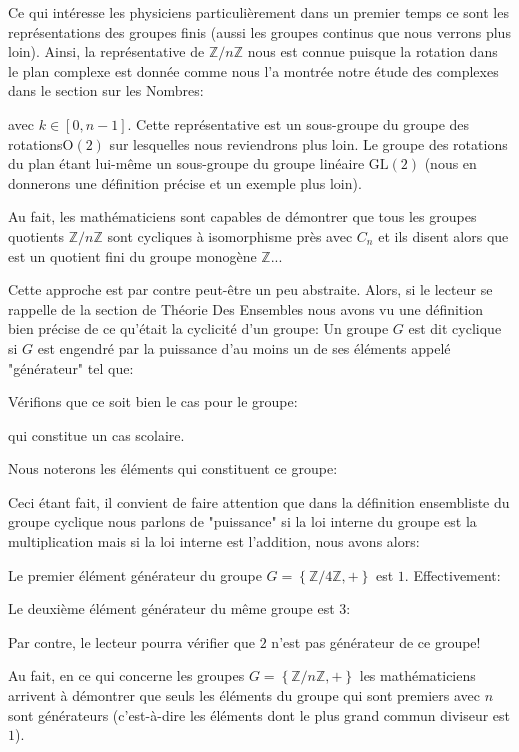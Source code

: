 	Ce qui intéresse les physiciens particulièrement dans un premier temps ce sont les représentations des groupes finis (aussi les groupes continus que nous verrons plus loin). Ainsi, la représentative de $\mathbb{Z}/n\mathbb{Z}$ nous est connue puisque la rotation dans le plan complexe est donnée comme nous l'a montrée notre étude des complexes dans le section sur les Nombres:
	
	avec $k\in[0,n-1]$. Cette représentative est un sous-groupe du groupe des rotations$\text{O}(2)$ sur lesquelles nous reviendrons plus loin. Le groupe des rotations du plan étant lui-même un sous-groupe du groupe linéaire $\text{GL}(2)$ (nous en donnerons une définition précise et un exemple plus loin).
	
	Au fait, les mathématiciens sont capables de démontrer que tous les groupes quotients $\mathbb{Z}/n\mathbb{Z}$ sont cycliques à isomorphisme près avec $C_n$ et ils disent alors que est un quotient fini du groupe monogène $\mathbb{Z}$...
	
	Cette approche est par contre peut-être un peu abstraite. Alors, si le lecteur se rappelle de la section de Théorie Des Ensembles nous avons vu une définition bien précise de ce qu'était la cyclicité d'un groupe: Un groupe $G$ est dit cyclique si $G$ est engendré par la puissance d'au moins un de ses éléments appelé "générateur" tel que:
	
	Vérifions que ce soit bien le cas pour le groupe:
	
	qui constitue un cas scolaire.
	
	Nous noterons les éléments qui constituent ce groupe:
	
	Ceci étant fait, il convient de faire attention que dans la définition ensembliste du groupe cyclique nous parlons de "puissance" si la loi interne du groupe est la multiplication mais si la loi interne est l'addition, nous avons alors:
	
	Le premier élément générateur du groupe $G=\left\lbrace \mathbb{Z}/4\mathbb{Z},+ \right\rbrace$ est $1$. Effectivement:
	
	Le deuxième élément générateur du même groupe est $3$:
	
	Par contre, le lecteur pourra vérifier que $2$ n'est pas générateur de ce groupe!
	
	Au fait, en ce qui concerne les groupes $G=\left\lbrace \mathbb{Z}/n\mathbb{Z},+ \right\rbrace$ les mathématiciens arrivent à démontrer que seuls les éléments du groupe qui sont premiers avec $n$ sont générateurs (c'est-à-dire les éléments dont le plus grand commun diviseur est $1$).
	

